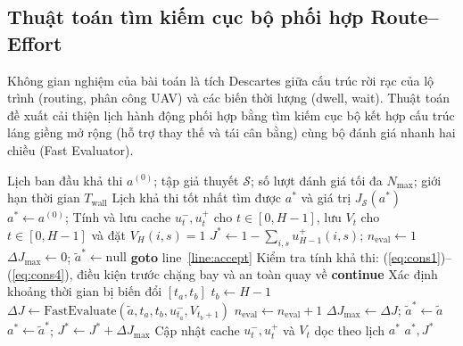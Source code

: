\documentclass[12pt,a4paper]{article}
\begin{document}
\subsection{Thuật toán tìm kiếm cục bộ phối hợp Route--Effort}

Không gian nghiệm của bài toán là tích Descartes giữa cấu trúc rời rạc của lộ trình (routing, phân công UAV) và các biến thời lượng (dwell, wait). Thuật toán đề xuất cải thiện lịch hành động phối hợp bằng tìm kiếm cục bộ kết hợp cấu trúc láng giềng mở rộng (hỗ trợ thay thế và tái cân bằng) cùng bộ đánh giá nhanh hai chiều (Fast Evaluator).

\begin{algorithm}[H]
\caption{Joint Route--Effort Local Search with Fast Evaluator}
\label{alg:joint}
\begin{algorithmic}[1]
\REQUIRE Lịch ban đầu khả thi $a^{(0)}$; tập giả thuyết $\mathcal{S}$; số lượt đánh giá tối đa $N_{\max}$; giới hạn thời gian $T_{\mathrm{wall}}$
\ENSURE Lịch khả thi tốt nhất tìm được $a^*$ và giá trị $J_{\mathcal{S}}(a^*)$
\STATE $a^* \leftarrow a^{(0)}$; Tính và lưu cache $u_t^-, u_t^+$ cho $t \in [0, H-1]$, lưu $V_t$ cho $t \in [0, H-1]$ và đặt $V_H(i,s) = 1$
\STATE $J^* \leftarrow 1 - \sum_{i,s} u_{H-1}^+(i,s)$; $n_{\mathrm{eval}} \leftarrow 1$
\REPEAT
    \STATE $\Delta J_{\max} \leftarrow 0$; $\tilde{a}^* \leftarrow \text{null}$
                \STATE \textbf{goto} line~\ref{line:accept}
            \ENDIF
            \STATE Kiểm tra tính khả thi: (\ref{eq:cons1})--(\ref{eq:cons4}), điều kiện trước chặng bay và an toàn quay về
                \STATE \textbf{continue}
            \ENDIF
            \STATE Xác định khoảng thời gian bị biến đổi $[t_a, t_b]$
                \STATE $t_b \leftarrow H-1$
            \ENDIF
            \STATE $\Delta J \leftarrow \text{FastEvaluate}(\tilde{a}, t_a, t_b, u_{t_a}^-, V_{t_b+1})$
            \STATE $n_{\mathrm{eval}} \leftarrow n_{\mathrm{eval}} + 1$
                \STATE $\Delta J_{\max} \leftarrow \Delta J$; $\tilde{a}^* \leftarrow \tilde{a}$
            \ENDIF
        \ENDFOR
    \ENDFOR
     \label{line:accept}
        \STATE $a^* \leftarrow \tilde{a}^*$; $J^* \leftarrow J^* + \Delta J_{\max}$
        \STATE Cập nhật cache $u_t^-, u_t^+$ và $V_t$ dọc theo lịch $a^*$
    \ENDIF
{}
\RETURN $a^*, J^*$
\end{algorithmic}
\end{algorithm}
\end{document}
